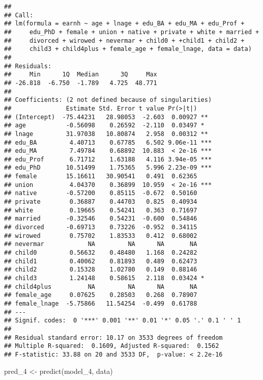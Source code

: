 \documentclass[
]{article}
\newenvironment{Shaded}{\begin{snugshade}}{\end{snugshade}}
\newcommand{\FunctionTok}[1]{\textcolor[rgb]{0.00,0.00,0.00}{#1}}
\newcommand{\NormalTok}[1]{#1}
\newcommand{\OtherTok}[1]{\textcolor[rgb]{0.56,0.35,0.01}{#1}}
\begin{document}
\begin{verbatim}
## 
## Call:
## lm(formula = earnh ~ age + lnage + edu_BA + edu_MA + edu_Prof + 
##     edu_PhD + female + union + native + private + white + married + 
##     divorced + wirowed + nevermar + child0 + +child1 + child2 + 
##     child3 + child4plus + female_age + female_lnage, data = data)
## 
## Residuals:
##     Min      1Q  Median      3Q     Max 
## -26.818  -6.750  -1.789   4.725  48.771 
## 
## Coefficients: (2 not defined because of singularities)
##               Estimate Std. Error t value Pr(>|t|)    
## (Intercept)  -75.44231   28.98053  -2.603  0.00927 ** 
## age           -0.56098    0.26592  -2.110  0.03497 *  
## lnage         31.97038   10.80874   2.958  0.00312 ** 
## edu_BA         4.40713    0.67785   6.502 9.06e-11 ***
## edu_MA         7.49784    0.68892  10.883  < 2e-16 ***
## edu_Prof       6.71712    1.63188   4.116 3.94e-05 ***
## edu_PhD       10.51499    1.75365   5.996 2.23e-09 ***
## female        15.16611   30.90541   0.491  0.62365    
## union          4.04370    0.36899  10.959  < 2e-16 ***
## native        -0.57200    0.85115  -0.672  0.50160    
## private        0.36887    0.44703   0.825  0.40934    
## white          0.19665    0.54241   0.363  0.71697    
## married       -0.32546    0.54231  -0.600  0.54846    
## divorced      -0.69713    0.73226  -0.952  0.34115    
## wirowed        0.75702    1.83533   0.412  0.68002    
## nevermar            NA         NA      NA       NA    
## child0         0.56632    0.48480   1.168  0.24282    
## child1         0.40062    0.81893   0.489  0.62473    
## child2         0.15328    1.02780   0.149  0.88146    
## child3         1.24148    0.58615   2.118  0.03424 *  
## child4plus          NA         NA      NA       NA    
## female_age     0.07625    0.28503   0.268  0.78907    
## female_lnage  -5.75866   11.54254  -0.499  0.61788    
## ---
## Signif. codes:  0 '***' 0.001 '**' 0.01 '*' 0.05 '.' 0.1 ' ' 1
## 
## Residual standard error: 10.17 on 3533 degrees of freedom
## Multiple R-squared:  0.1609, Adjusted R-squared:  0.1562 
## F-statistic: 33.88 on 20 and 3533 DF,  p-value: < 2.2e-16
\end{verbatim}

\begin{Shaded}
\begin{Highlighting}[]
\NormalTok{pred\_4 }\OtherTok{\textless{}{-}} \FunctionTok{predict}\NormalTok{(model\_4, data)}
\end{Highlighting}
\end{Shaded}
\end{document}
